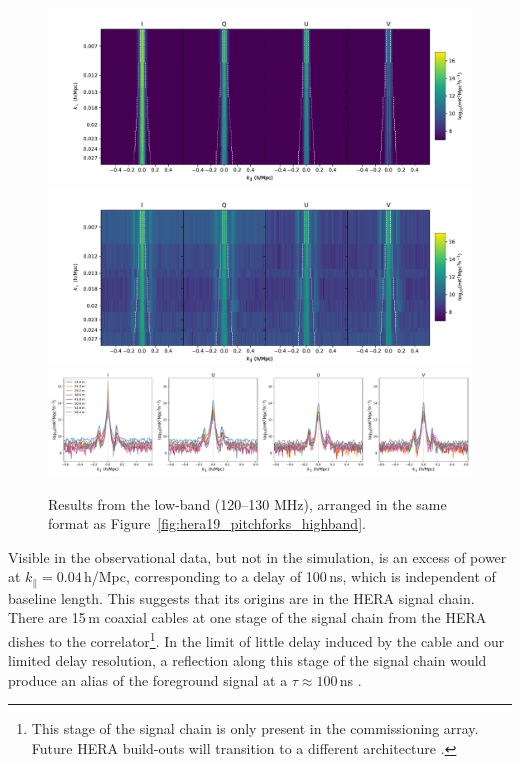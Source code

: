 \begin{figure}[h]
\centering
\includegraphics[scale=0.45]{chapters/eor_window_HERA/figures/timeavg_SIM_low.pdf}
\includegraphics[scale=0.45]{chapters/eor_window_HERA/figures/timeavg_low.pdf}
\includegraphics[scale=0.3]{chapters/eor_window_HERA/figures/timeavg_1d_low.pdf}
\caption[Power spectrum results from the low-band (120--130 MHz).]{Results from the low-band (120--130 MHz), arranged in the same format as Figure~\ref{fig:hera19_pitchforks_highband}.}
\label{fig:hera19_pitchforks_lowband}
\end{figure}

Visible in the observational data, but not in the simulation, is an excess of power at $k_{\parallel}=0.04$\,h/Mpc, corresponding to a delay of 100\,ns, which is independent of baseline length. This suggests that its origins are in the HERA signal chain. There are 15\,m coaxial cables at one stage of the signal chain from the HERA dishes to the correlator\footnote{This stage of the signal chain is only present in the commissioning array. Future HERA build-outs will transition to a different architecture \citep{deBoer.17}.}. In the limit of little delay induced by the cable and our limited delay resolution, a reflection along this stage of the signal chain would produce an alias of the foreground signal at a $\tau \approx 100$\,ns \citep{Beardsley.16, Ewall-Wice.EoX}.

